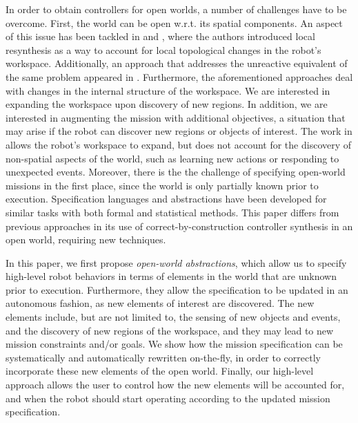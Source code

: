 In order to obtain controllers for open worlds, a number of challenges have to be overcome. 
First, the world can be open w.r.t. its spatial components. An aspect of this issue has been tackled in \cite{MurrayICRA2012} and \cite{MurrayICRA2013a}, where the authors introduced local resynthesis as a way to account for local topological changes in the robot's workspace. 
Additionally, an approach that addresses the unreactive equivalent of the same problem appeared in \cite{Dimos2013ICRA}. 
Furthermore, the aforementioned approaches deal with changes in the internal structure of the workspace. We are interested in expanding the workspace upon discovery of new regions.
In addition, we are interested in augmenting the mission with additional objectives, a situation that may arise if the robot can discover new regions or objects of interest. 
The work in \cite{BingxinRSS2012} allows the robot's workspace to expand, but does not account for the discovery of non-spatial aspects of the world, such as learning new actions or responding to unexpected events.
Moreover, there is the the challenge of specifying open-world missions in the first place, since the world is only partially known prior to execution. 
Specification languages and abstractions have been developed for similar tasks with both formal \cite{Joshi2012, MatthiasAI2010} and statistical \cite{Tellex2011} methods.
This paper differs from previous approaches in its use of correct-by-construction controller synthesis in an open world, requiring new techniques.

In this paper, we first propose \emph{open-world abstractions}, which allow us to specify high-level robot behaviors in terms of elements in the world that are unknown prior to execution.
Furthermore, they allow the specification to be updated in an autonomous fashion, as new elements of interest are discovered. The new elements include, but are not limited to, the sensing of new objects and events, and the discovery of new regions of the workspace, and they may lead to new mission constraints and/or goals.
We show how the mission specification can be systematically and automatically rewritten on-the-fly, in order to correctly incorporate these new elements of the open world. 
Finally, our high-level approach allows the user to control how the new elements will be accounted for, and when the robot should start operating according to the updated mission specification.

